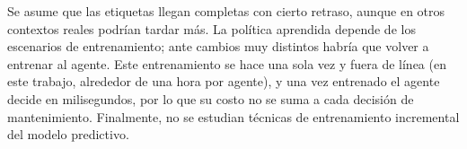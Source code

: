 Se asume que las etiquetas llegan completas con cierto retraso, aunque en otros
contextos reales podrían tardar más. La política aprendida depende de los escenarios de entrenamiento;
ante cambios muy distintos habría que volver a entrenar al agente. Este entrenamiento se
hace una sola vez y fuera de línea (en este trabajo, alrededor de una hora por agente), y
una vez entrenado el agente decide en milisegundos, por lo que su costo no se suma a cada
decisión de mantenimiento. Finalmente, no se estudian técnicas de entrenamiento incremental
del modelo predictivo.